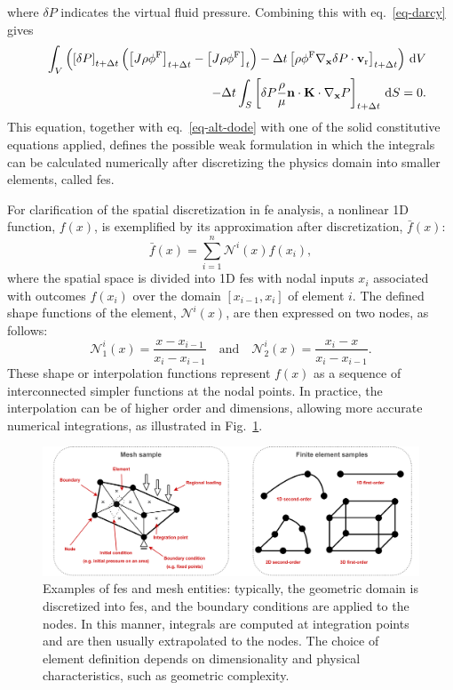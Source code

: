 \documentclass[12pt,a4paper]{report}
\begin{document}
%
where $\delta P$ indicates the virtual fluid pressure. Combining this with eq.~\ref{eq-darcy} gives
%
\begin{eqnarray}\label{eq-fluid-2}
    & & \int_V \left( \left[ \delta P \right]_{t+\Delta t} \left( \left[ J \rho \phi^{\rm F} \right]_{t+\Delta t} - \left[ J \rho \phi^{\rm F} \right]_{t} \right) - \Delta t \left[ \rho \phi^{\rm F} \nabla_{\mathbf{x}} \delta P \cdot \mathbf{v}_{\rm r} \right]_{t+\Delta t} \right) \, \mathrm{d}V \nonumber \\
    & & - \Delta t \int_S \left[ \delta P \frac{\rho}{\mu } \mathbf{n} \cdot \mathbf{K} \cdot \nabla_\mathbf{x} P \right]_{t+\Delta t} \, \mathrm{d}S = 0.
\end{eqnarray}
%
This equation, together with eq.~\ref{eq-alt-dode} with one of the solid constitutive equations applied, defines the possible weak formulation in which the integrals can be calculated numerically after discretizing the physics domain into smaller elements, called \ac{fe}s.

For clarification of the spatial discretization in \ac{fe} analysis, a nonlinear 1D function, \( f(x) \), is exemplified by its approximation after discretization, \( \bar{f}(x) \):
%
\begin{equation}\label{eq-alt-shape}
    \bar{f}(x) = \sum_{i=1}^{n} \mathcal{N}^{i}(x) f(x_i),
\end{equation}
%
where the spatial space is divided into 1D \ac{fe}s with nodal inputs \( x_i \) associated with outcomes \( f(x_i) \) over the domain \( [x_{i-1}, x_i] \) of element $i$. The defined shape functions of the element, \( \mathcal{N}^i(x) \), are then expressed on two nodes, as follows:
%
\begin{equation}
    \mathcal{N}_1^{i}(x) = \frac{x - x_{i-1}}{x_i - x_{i-1}} 
    \quad \text{and} \quad 
    \mathcal{N}_2^{i}(x) = \frac{x_i - x}{x_i - x_{i-1}}.
\end{equation}
%
These shape or interpolation functions represent \( f(x) \) as a sequence of interconnected simpler functions at the nodal points. In practice, the interpolation can be of higher order and dimensions, allowing more accurate numerical integrations, as illustrated in Fig.~\ref{fea}.
%
\begin{figure}
\includegraphics[width=1\linewidth]{fea.png}
\caption{Examples of \acp{fe} and mesh entities: typically, the geometric domain is discretized into \acp{fe}, and the boundary conditions are applied to the nodes. In this manner, integrals are computed at integration points and are then usually extrapolated to the nodes. The choice of element definition depends on dimensionality and physical characteristics, such as geometric complexity.}
\label{fea}
\end{figure}
\end{document}
